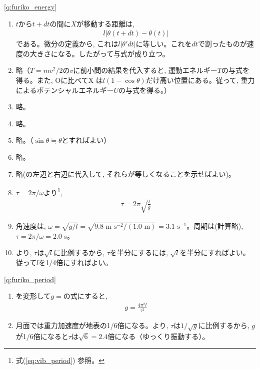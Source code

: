 \ref{q:furiko_energy}
\begin{enumerate}
\item $t$から$t+dt$の間に$X$が移動する距離は, 
\begin{eqnarray*}
l|\theta(t+dt)-\theta(t)|
\end{eqnarray*}である。微分の定義から, 
これは$l|\theta'dt|$に等しい。これを$dt$で割ったものが速度の大きさになる。したがって与式が成り立つ。
\item 略（$T=mv^2/2$の$v$に前小問の結果を代入すると, 運動エネルギー$T$の与式を得る。また, Oに比べてX
は$l(1-\cos\theta)$だけ高い位置にある。従って, 重力によるポテンシャルエネルギー$U$の与式を得る。）
\item 略。
\item 略。
\item 略。（$\sin \theta \fallingdotseq \theta$とすればよい）
\item 略。
\item 略(の左辺と右辺に代入して, それらが等しくなることを示せばよい)。
\item $\tau=2\pi/\omega$より\footnote{式(\ref{eq:vib_period}) 参照。}, 
\begin{eqnarray}\tau=2\pi\sqrt{\frac{l}{g}}\label{eq:furiko_energy_ans5}\end{eqnarray}
\item 角速度は, $\omega=\sqrt{g/l}=\sqrt{9.8\text{ m s}^{-2}/(1.0\text{ m})}=3.1\text{ s}^{-1}$。周期は(計算略), $\tau=2\pi/\omega=2.0$ s。
\item {}より, $\tau$は$\sqrt{l}$に比例するから, $\tau$を半分にするには, $\sqrt{l}$を半分にすればよい。従って$l$を1/4倍にすればよい。
\end{enumerate}
\vspace{0.2cm}

\ref{q:furiko_period}
\begin{enumerate}
\item {}を変形して$g=$の式にすると, 
\begin{eqnarray}g=\frac{4\pi^2l}{\tau^2}\end{eqnarray}
\item 月面では重力加速度が地表の1/6倍になる。より, 
$\tau$は$1/\sqrt{g}$に比例するから, $g$が1/6倍になると$\tau$は$\sqrt{6}=2.4$倍になる（ゆっくり振動する）。
\end{enumerate}
\mv


